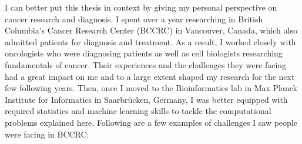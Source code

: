 I can better put this thesis in context by giving my personal perspective on
cancer research and diagnosis. I spent over a year researching in British
Columbia's Cancer Research Center (BCCRC) in Vancouver, Canada, which also
admitted patients for diagnosis and treatment. As a result, I worked closely
with oncologists who were diagnosing patients as well as cell biologists
researching fundamentals of cancer. Their experiences and the challenges they
were facing had a great impact on me and to a large extent shaped my research
for the next few following years. Then, once I moved to the Bioinformatics lab
in Max Planck Institute for Informatics in Saarbr\"ucken, Germany, I was better
equipped with required statistics and machine learning skills to tackle the
computational problems explained here. Following are a few examples of
challenges I saw people were facing in BCCRC:

